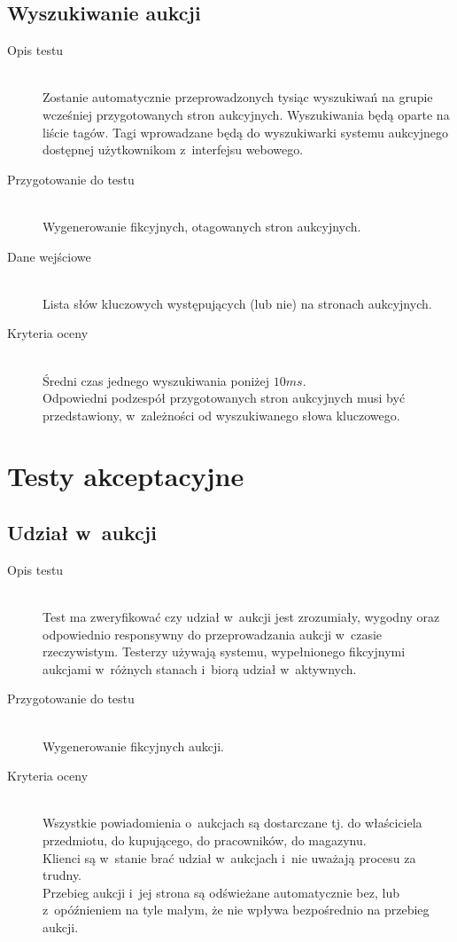 \documentclass[10pt,a4paper]{article}
\begin{document}
\subsection{Wyszukiwanie aukcji}
\begin{description}
  \item[Opis testu] \hfill \\
    Zostanie automatycznie przeprowadzonych tysiąc wyszukiwań na grupie
    wcześniej przygotowanych stron aukcyjnych. Wyszukiwania będą oparte na
    liście tagów. Tagi wprowadzane będą do wyszukiwarki systemu aukcyjnego
    dostępnej użytkownikom z~interfejsu webowego.
  \item[Przygotowanie do testu] \hfill \\
    Wygenerowanie fikcyjnych, otagowanych stron aukcyjnych.
  \item[Dane wejściowe] \hfill \\
    Lista słów kluczowych występujących (lub nie) na stronach aukcyjnych.
  \item[Kryteria oceny] \hfill \\
    Średni czas jednego wyszukiwania poniżej $10 ms$.\\
    Odpowiedni podzespół przygotowanych stron aukcyjnych musi być
    przedstawiony, w~zależności od wyszukiwanego słowa kluczowego.
\end{description}

\section{Testy akceptacyjne}

\subsection{Udział w~aukcji}
\begin{description}
  \item[Opis testu] \hfill \\
    Test ma zweryfikować czy udział w~aukcji jest zrozumiały, wygodny oraz
    odpowiednio responsywny do przeprowadzania aukcji w~czasie rzeczywistym.
    Testerzy używają systemu, wypełnionego fikcyjnymi aukcjami w~różnych
    stanach i~biorą udział w~aktywnych.
  \item[Przygotowanie do testu] \hfill \\
    Wygenerowanie fikcyjnych aukcji.
  \item[Kryteria oceny] \hfill \\
    Wszystkie powiadomienia o~aukcjach są dostarczane tj. do właściciela
    przedmiotu, do kupującego, do pracowników, do magazynu.\\
    Klienci są w~stanie brać udział w~aukcjach i~nie uważają procesu za
    trudny.\\
    Przebieg aukcji i~jej strona są odświeżane automatycznie bez, lub
    z~opóźnieniem na tyle małym, że nie wpływa bezpośrednio na przebieg aukcji.
\end{description}
\end{document}
